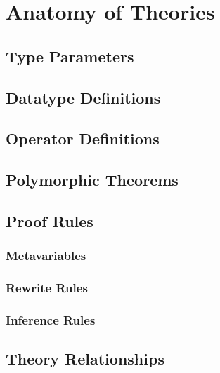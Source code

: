 \section{Anatomy of Theories}
\subsection{Type Parameters}
\subsection{Datatype Definitions}
\subsection{Operator Definitions}
\subsection{Polymorphic Theorems}
\subsection{Proof Rules}
\subsubsection{Metavariables}
\subsubsection{Rewrite Rules}
\subsubsection{Inference Rules}
\subsection{Theory Relationships}